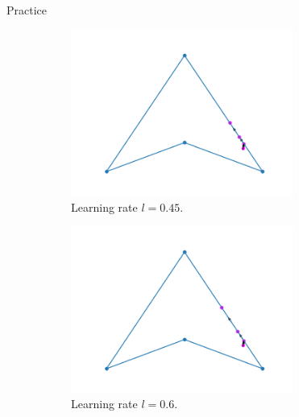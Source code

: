 \documentclass{beamer}
\begin{document}
\begin{frame}{Practice}
	\begin{figure}[h!]
		\centering
		\begin{subfigure}{0.45\textwidth}
			\centering
			\includegraphics[width = 0.8\textwidth]{Images/concave_triangle_gradient_045.png}
			\caption{Learning rate $l = 0.45$.}
			\label{fig:concave_gradient_045}
		\end{subfigure}
		\begin{subfigure}{0.45\textwidth}
			\centering
			\includegraphics[width = 0.8\textwidth]{Images/concave_triangle_gradient_06.png}
			\caption{Learning rate $l = 0.6$.}
			\label{fig:concave_gradient_06}
		\end{subfigure}
		\begin{subfigure}{0.45\textwidth}
			\centering

\end{subfigure}
\end{figure}
\end{frame}
\end{document}
